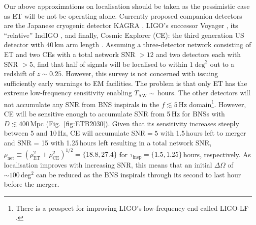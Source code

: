 \documentclass{aa}
\begin{document}

Our above approximations on localisation should be taken as the pessimistic case as 
ET will be not be operating alone. 
Currently proposed companion detectors are the Japanese cryogenic detector KAGRA \citep{Akutsu:2017thy,KAGRA2}, LIGO's successor Voyager \citep{LIGO_Voy}, its ``relative'' IndIGO \citep{Unnikrishnan:2013qwa}, 
and finally, Cosmic Explorer (CE): the third generation US detector with 40\,km arm length \citep{Evans:2016mbw}.  
Assuming a three-detector network consisting of ET and two CEs with a total network SNR $> 12$ and two detectors 
each with SNR $> 5$, \cite{Mills:2017urp} find that half of signals will be localised to within $1~\mathrm{deg}^2$
out to a redshift of $z\sim 0.25$. However, this survey is not concerned with issuing sufficiently early warnings to EM facilities. %
The problem is that only ET has the extreme low-frequency sensitivity enabling $T_\text{AW}\sim\,$hours.
The other detectors will not accumulate any SNR from BNS inspirals in the $f\lesssim 5\,$Hz domain\footnote{There is a prospect for improving LIGO's low-frequency end called LIGO-LF \citep{Yu:2017zgi}.}.
However, CE will be sensitive enough to accumulate SNR from 5\,Hz for BNSs with $D\lesssim 400\,$Mpc (Fig.~\ref{fig:ETB2030}).
Given that its sensitivity increases steeply between 5 and 10\,Hz, CE will accumulate $\text{SNR} = 5$ with 1.5\,hours left to merger and SNR = 15 with 1.25\,hours left
resulting in a total network SNR, $\rho_\text{net} \equiv (\rho_\text{ET}^2+\rho_\text{CE}^2)^{1/2}=\{18.8,27.4\}$ %
for $\tau_\text{insp}=\{1.5, 1.25\}\,$hours, respectively.
As localisation improves with increasing SNR, this means that an initial $\Delta\Omega$ of $\sim 100\,$deg$^2$
can be reduced as the BNS inspirals through its second to last hour before the merger.
\end{document}
